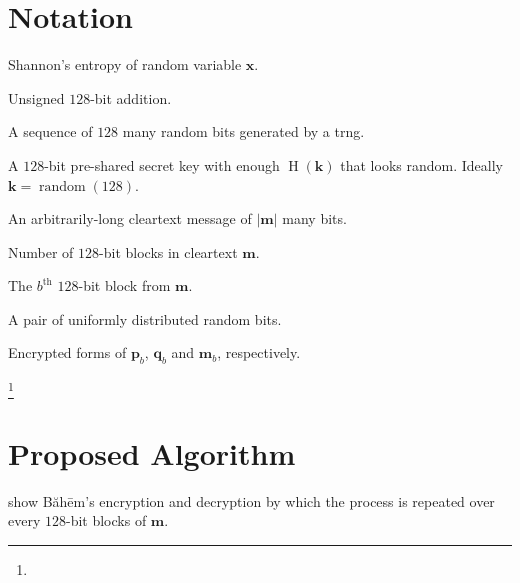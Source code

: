 \documentclass[twocolumn,hidelinks]{article}
\newcommand{\baheem}{Băhēm}
\newcommand\blfootnote[1]{%
  \begingroup
  \renewcommand\thefootnote{}\footnote{#1}%
  \addtocounter{footnote}{-1}%
  \endgroup
}
\DeclareMathOperator{\random}{random}
\DeclareMathOperator{\entropy}{H}
\begin{document}
\section*{Notation}
\begin{description}[itemsep=0em]
    \item[$\entropy(\mathbf{x})$:]  Shannon's entropy of random variable
        $\mathbf{x}$.

    \item[$\mathbf{x} + \mathbf{y} \bmod{2^{128}}$:]  Unsigned $128$-bit
        addition.

    \item[$\random(128)$:]  A sequence of $128$ many random bits generated
        by a \gls{trng}.

    \item[$\mathbf{k}$:]  A $128$-bit pre-shared secret key with enough
        $\entropy(\mathbf{k})$ that looks random.  Ideally $\mathbf{k} =
        \random(128)$.

    \item[$\mathbf{m}$:]  An arbitrarily-long cleartext message of
        $|\mathbf{m}|$ many bits.

    \item[$\lceil\frac{|\mathbf{m}|}{128}\rceil$:]  Number of $128$-bit
        blocks in cleartext $\mathbf{m}$.

    \item[$\mathbf{m}_b$:]  The $b^{\text{th}}$ $128$-bit block from
        $\mathbf{m}$.

    \item[$\mathbf{p}_b = \random(128), \mathbf{q}_b = \random(128)$:]  A
        pair of uniformly distributed random bits.

    \item[$\mathbf{\hat p}_b, \mathbf{\hat q}_b, \mathbf{\hat m}_b$:]
        Encrypted forms of $\mathbf{p}_b$, $\mathbf{q}_b$ and
        $\mathbf{m}_b$, respectively.
\end{description}

\break

\tableofcontents

\blfootnote{\vspace{-1em}\doclicenseThis}

\section{Proposed Algorithm}
 show \baheem's encryption and decryption by which
the process is repeated over every $128$-bit blocks of $\mathbf{m}$.
\end{document}
